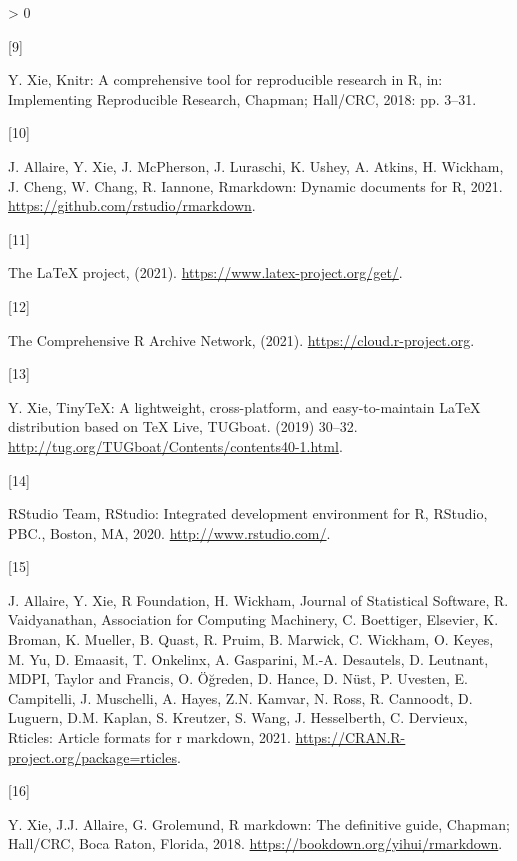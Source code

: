 \documentclass[]{elsarticle} %
\newlength{\csllabelwidth}
\newlength{\cslhangindent}
\newenvironment{CSLReferences}[3] %
 {%
  \setlength{\parindent}{0pt}
  \ifodd #1 \everypar{\setlength{\hangindent}{\cslhangindent}}\ignorespaces\fi
  \ifnum #2 > 0
  \setlength{\parskip}{#2\baselineskip}
  \fi
 }%
 {}
\newcommand{\CSLLeftMargin}[1]{\parbox[t]{\csllabelwidth}{#1}}
\newcommand{\CSLRightInline}[1]{\parbox[t]{\linewidth - \csllabelwidth}{#1}}
\begin{document}
\begin{CSLReferences}{0}{0}
\leavevmode\hypertarget{ref-xie2018knitr}{}%
\CSLLeftMargin{{[}9{]} }
\CSLRightInline{Y. Xie, Knitr: A comprehensive tool for reproducible
research in {R}, in: Implementing Reproducible Research, Chapman;
Hall/CRC, 2018: pp. 3--31.}

\leavevmode\hypertarget{ref-allaire2021}{}%
\CSLLeftMargin{{[}10{]} }
\CSLRightInline{J. Allaire, Y. Xie, J. McPherson, J. Luraschi, K. Ushey,
A. Atkins, H. Wickham, J. Cheng, W. Chang, R. Iannone, Rmarkdown:
Dynamic documents for {R}, 2021.
\url{https://github.com/rstudio/rmarkdown}.}

\leavevmode\hypertarget{ref-latex_link}{}%
\CSLLeftMargin{{[}11{]} }
\CSLRightInline{{The LaTeX project}, (2021).
\url{https://www.latex-project.org/get/}.}

\leavevmode\hypertarget{ref-Rdownload}{}%
\CSLLeftMargin{{[}12{]} }
\CSLRightInline{{The Comprehensive R Archive Network}, (2021).
\url{https://cloud.r-project.org}.}

\leavevmode\hypertarget{ref-xie2019}{}%
\CSLLeftMargin{{[}13{]} }
\CSLRightInline{Y. Xie, TinyTeX: A lightweight, cross-platform, and
easy-to-maintain LaTeX distribution based on {TeX Live}, TUGboat. (2019)
30--32. \url{http://tug.org/TUGboat/Contents/contents40-1.html}.}

\leavevmode\hypertarget{ref-Rstudio}{}%
\CSLLeftMargin{{[}14{]} }
\CSLRightInline{RStudio Team, RStudio: Integrated development
environment for {R}, RStudio, PBC., Boston, MA, 2020.
\url{http://www.rstudio.com/}.}

\leavevmode\hypertarget{ref-rticles}{}%
\CSLLeftMargin{{[}15{]} }
\CSLRightInline{J. Allaire, Y. Xie, R Foundation, H. Wickham, Journal of
Statistical Software, R. Vaidyanathan, Association for Computing
Machinery, C. Boettiger, Elsevier, K. Broman, K. Mueller, B. Quast, R.
Pruim, B. Marwick, C. Wickham, O. Keyes, M. Yu, D. Emaasit, T. Onkelinx,
A. Gasparini, M.-A. Desautels, D. Leutnant, MDPI, Taylor and Francis, O.
Öğreden, D. Hance, D. Nüst, P. Uvesten, E. Campitelli, J. Muschelli, A.
Hayes, Z.N. Kamvar, N. Ross, R. Cannoodt, D. Luguern, D.M. Kaplan, S.
Kreutzer, S. Wang, J. Hesselberth, C. Dervieux, Rticles: Article formats
for r markdown, 2021. \url{https://CRAN.R-project.org/package=rticles}.}

\leavevmode\hypertarget{ref-rmarkdowndefinitive}{}%
\CSLLeftMargin{{[}16{]} }
\CSLRightInline{Y. Xie, J.J. Allaire, G. Grolemund, R markdown: The
definitive guide, Chapman; Hall/CRC, Boca Raton, Florida, 2018.
\url{https://bookdown.org/yihui/rmarkdown}.}


\end{CSLReferences}
\end{document}
